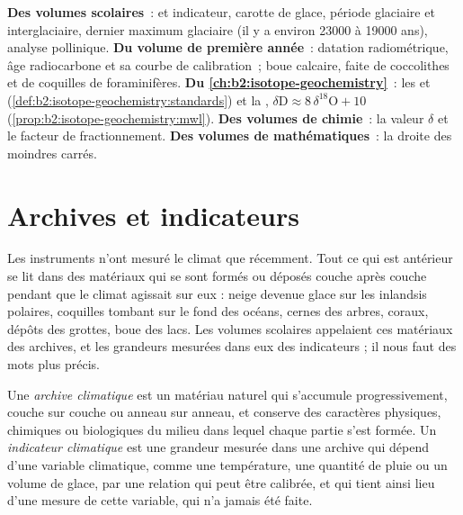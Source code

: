 \begin{recall}
\textbf{Des volumes scolaires}~:  et indicateur, carotte de glace, période glaciaire et
interglaciaire, dernier maximum glaciaire (il y a environ \num{23000} à \num{19000} ans), analyse
pollinique. \textbf{Du volume de première année}~: datation radiométrique, âge radiocarbone et sa
courbe de calibration~; boue calcaire, faite de coccolithes et de coquilles de foraminifères.
\textbf{Du \cref{ch:b2:isotope-geochemistry}}~: les   et 
(\cref{def:b2:isotope-geochemistry:standards}) et la , $\delta\mathrm{D}
\approx 8\,\delta^{18}\mathrm{O} + 10$ (\cref{prop:b2:isotope-geochemistry:mwl}). \textbf{Des volumes de
chimie}~: la valeur $\delta$ et le facteur de fractionnement. \textbf{Des volumes de mathématiques}~:
la droite des moindres carrés.
\end{recall}

\section{Archives et indicateurs}\label{sec:b2:climate-proxies:archives}

Les instruments n'ont mesuré le climat que récemment. Tout ce qui est antérieur se lit dans des matériaux
qui se sont formés ou déposés couche après couche pendant que le climat agissait sur eux : neige devenue glace sur
les inlandsis polaires, coquilles tombant sur le fond des océans, cernes des arbres, coraux, dépôts des
grottes, boue des lacs. Les volumes scolaires appelaient ces matériaux des archives, et les grandeurs
mesurées dans eux des indicateurs ; il nous faut des mots plus précis.

\begin{definition}\label{def:b2:climate-proxies:proxy}
Une \emph{archive climatique} est un matériau naturel qui s'accumule
progressivement, couche sur couche ou anneau sur anneau, et conserve des caractères physiques, chimiques ou biologiques
du milieu dans lequel chaque partie s'est formée. Un \emph{indicateur
climatique} est une grandeur mesurée dans une archive qui dépend d'une variable
climatique, comme une température, une quantité de pluie ou un volume de glace, par une relation qui peut être
calibrée, et qui tient ainsi lieu d'une mesure de cette variable, qui n'a jamais été faite.
\end{definition}

